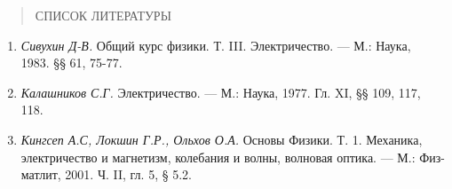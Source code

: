 \documentclass[]{article}
\begin{document}
\begin{quote}
СПИСОК ЛИТЕРАТУРЫ
\end{quote}

\begin{enumerate}
\def\labelenumi{\arabic{enumi}.}
\item
  \emph{Сивухин Д-В.} Общий курс физики. Т. III. Электричество. --- М.:
  Наука,\\
  1983. §§ 61, 75-77.
\item
  \emph{Калашников С.Г.} Электричество. --- М.: Наука, 1977. Гл. XI, §§
  109, 117,\\
  118.
\item
  \emph{Кингсеп А.С, Локшин Г.Р., Ольхов О.А.} Основы Физики. Т. 1.
  Механика,\\
  электричество и магнетизм, колебания и волны, волновая оптика. --- М.:
  Физ-\\
  матлит, 2001. Ч. II, гл. 5, § 5.2.
\end{enumerate}
\end{document}
